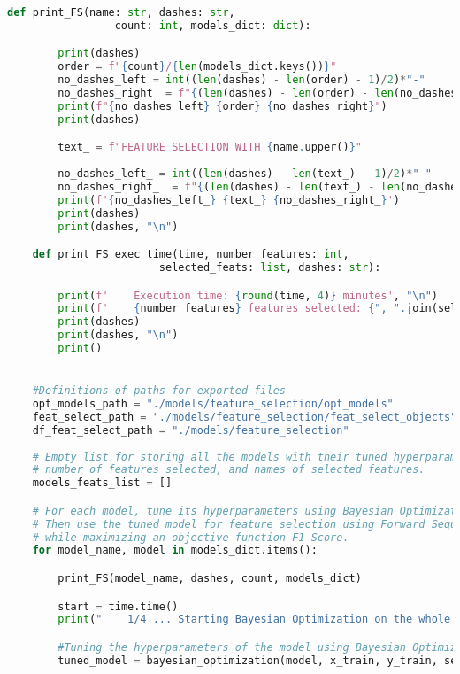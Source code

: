 \begin{lstlisting}[language=Python, basicstyle=\footnotesize\ttfamily]
    def print_FS(name: str, dashes: str,
                 count: int, models_dict: dict):

        print(dashes)
        order = f"{count}/{len(models_dict.keys())}"
        no_dashes_left = int((len(dashes) - len(order) - 1)/2)*"-"
        no_dashes_right  = f"{(len(dashes) - len(order) - len(no_dashes_left) - 2)*'-'}"
        print(f"{no_dashes_left} {order} {no_dashes_right}")
        print(dashes)

        text_ = f"FEATURE SELECTION WITH {name.upper()}"
        
        no_dashes_left_ = int((len(dashes) - len(text_) - 1)/2)*"-"
        no_dashes_right_  = f"{(len(dashes) - len(text_) - len(no_dashes_left_) - 2)*'-'}"
        print(f'{no_dashes_left_} {text_} {no_dashes_right_}')
        print(dashes)
        print(dashes, "\n")

    def print_FS_exec_time(time, number_features: int,
                        selected_feats: list, dashes: str):

        print(f'    Execution time: {round(time, 4)} minutes', "\n")
        print(f'    {number_features} features selected: {", ".join(selected_feats)}', "\n")
        print(dashes)
        print(dashes, "\n")
        print()


    #Definitions of paths for exported files    
    opt_models_path = "./models/feature_selection/opt_models"
    feat_select_path = "./models/feature_selection/feat_select_objects"
    df_feat_select_path = "./models/feature_selection"
    
    # Empty list for storing all the models with their tuned hyperparameters,
    # number of features selected, and names of selected features.
    models_feats_list = []

    # For each model, tune its hyperparameters using Bayesian Optimization.
    # Then use the tuned model for feature selection using Forward Sequential Feature Selector,
    # while maximizing an objective function F1 Score.
    for model_name, model in models_dict.items():

        print_FS(model_name, dashes, count, models_dict)

        start = time.time()
        print("    1/4 ... Starting Bayesian Optimization on the whole set of features")

        #Tuning the hyperparameters of the model using Bayesian Optimization.
        tuned_model = bayesian_optimization(model, x_train, y_train, seed, objective_function)


\end{lstlisting}
